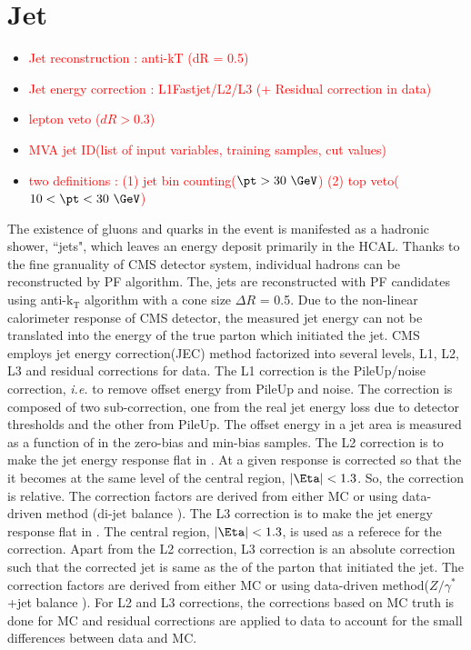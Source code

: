 \section{ Jet }
\label{sec:jetselection}
\begin{itemize}
\item \textcolor{red}{Jet reconstruction : anti-kT (dR = 0.5) }
\item \textcolor{red}{Jet energy correction : L1Fastjet/L2/L3 (+ Residual correction in data) }
\item \textcolor{red}{lepton veto ($dR>0.3$) }
\item \textcolor{red}{MVA jet ID(list of input variables, training samples, cut values)}
\item \textcolor{red}{two definitions : (1) jet bin counting($\pt>30~\GeV$) (2) top veto($10<\pt<30~\GeV$) }
\end{itemize}

The existence of gluons and quarks in the event is manifested as a hadronic shower, 
``jets", which leaves an energy deposit primarily in the HCAL. 
Thanks to the fine granuality of CMS detector system, individual hadrons can 
be reconstructed by PF algorithm. 
The, jets are reconstructed with PF candidates using anti-$\textrm{k}_\textrm{T}$ algorithm \cite{}
with a cone size $\Delta R$ = 0.5. Due to the non-linear calorimeter response of CMS detector, 
the measured jet energy can not be translated into the energy of the true parton which 
initiated the jet. CMS employs jet energy correction(JEC) method \cite{} factorized into 
several levels, L1, L2, L3 and residual corrections for data. 
The L1 correction is the PileUp/noise correction, \textit{i.e.} to remove offset energy 
from PileUp and noise. The correction is composed of two sub-correction, 
one from the real jet energy loss due to detector thresholds and 
the other from PileUp. The offset energy in a jet area is measured as a function 
of \Eta{} in the zero-bias and min-bias samples.    
The L2 correction is to make the jet energy response flat in \Eta.  
At a given \Eta{} response is corrected so that the it becomes at the same level 
of the central region, $|\Eta|<1.3$. So, the correction is relative. 
The correction factors are derived from either MC or using data-driven method
(di-jet balance \cite{}).
The L3 correction is to make the jet energy response flat in \pt.  
The central region, $|\Eta|<1.3$, is used as a referece for the correction. 
Apart from the L2 correction, L3 correction is an absolute correction 
such that the corrected jet \pt{} is same as the \pt{} of the parton that 
initiated the jet. The correction factors are derived from either MC 
or using data-driven method($Z/\gamma^*$+jet balance \cite{}). 
For L2 and L3 corrections, the corrections based on MC truth is done for MC 
and residual corrections are applied to data to account for the small differences 
between data and MC. 

